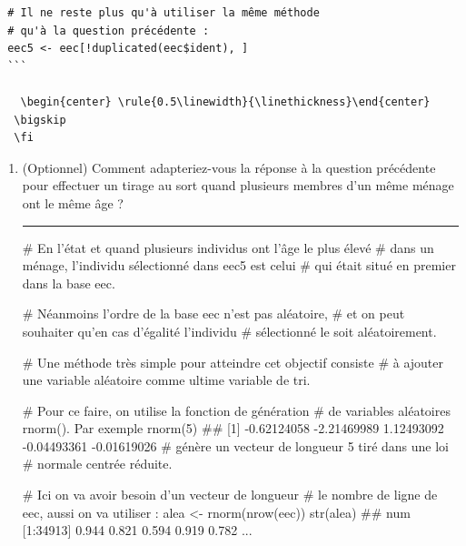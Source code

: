 \documentclass[12pt,twosided, notitlepage]{book}
\newenvironment{Shaded}{}{}
\newcommand{\CommentTok}[1]{\textcolor[rgb]{0.00,0.50,0.00}{#1}}
\newcommand{\DecValTok}[1]{#1}
\newcommand{\KeywordTok}[1]{\textcolor[rgb]{0.00,0.00,1.00}{#1}}
\newcommand{\NormalTok}[1]{#1}
\newcommand{\StringTok}[1]{\textcolor[rgb]{0.00,0.50,0.50}{#1}}
\newif \ifsol
\renewenvironment{Shaded}{\begin{snugshade}}{\end{snugshade}}
\begin{document}
\begin{enumerate}
\begin{verbatim}
 # Il ne reste plus qu'à utiliser la même méthode 
 # qu'à la question précédente :
 eec5 <- eec[!duplicated(eec$ident), ]
 ```

   \begin{center} \rule{0.5\linewidth}{\linethickness}\end{center} 
  \bigskip 
  \fi 
\end{verbatim}

  \begin{enumerate}
  \def\labelenumii{\roman{enumii}.}
  \setcounter{enumii}{3}
  \item
    (Optionnel) Comment adapteriez-vous la réponse à la question
    précédente pour effectuer un tirage au sort quand plusieurs membres
    d'un même ménage ont le même âge ?

    \ifsol

    \textbf{Indication} Pensez à utiliser une variable aléatoire
    (générée par exemple avec \texttt{rnorm()} ou \texttt{runif()}) dans
    la fonction \texttt{order()}.\fi  \ifsol 

    \begin{center} \rule{0.5\linewidth}{\linethickness}\end{center}

\begin{Shaded}
\begin{Highlighting}[]
\CommentTok{# En l'état et quand plusieurs individus ont l'âge le plus élevé}
\CommentTok{# dans un ménage, l'individu sélectionné dans eec5 est celui}
\CommentTok{# qui était situé en premier dans la base eec. }

\CommentTok{# Néanmoins l'ordre de la base eec n'est pas aléatoire, }
\CommentTok{# et on peut souhaiter qu'en cas d'égalité l'individu}
\CommentTok{# sélectionné le soit aléatoirement.}

\CommentTok{# Une méthode très simple pour atteindre cet objectif consiste}
\CommentTok{# à ajouter une variable aléatoire comme ultime variable de tri. }

\CommentTok{# Pour ce faire, on utilise la fonction de génération }
\CommentTok{# de variables aléatoires rnorm(). Par exemple }
\KeywordTok{rnorm}\NormalTok{(}\DecValTok{5}\NormalTok{)}
\NormalTok{  ## [1] -0.62124058 -2.21469989  1.12493092 -0.04493361 -0.01619026}
\CommentTok{# génère un vecteur de longueur 5 tiré dans une loi }
\CommentTok{# normale centrée réduite. }

\CommentTok{# Ici on va avoir besoin d'un vecteur de longueur}
\CommentTok{# le nombre de ligne de eec, aussi on va utiliser : }
\NormalTok{alea <-}\StringTok{ }\KeywordTok{rnorm}\NormalTok{(}\KeywordTok{nrow}\NormalTok{(eec))}
\KeywordTok{str}\NormalTok{(alea)}
\NormalTok{  ##  num [1:34913] 0.944 0.821 0.594 0.919 0.782 ...}


\end{Highlighting}
\end{Shaded}
\end{enumerate}
\end{enumerate}
\end{document}
